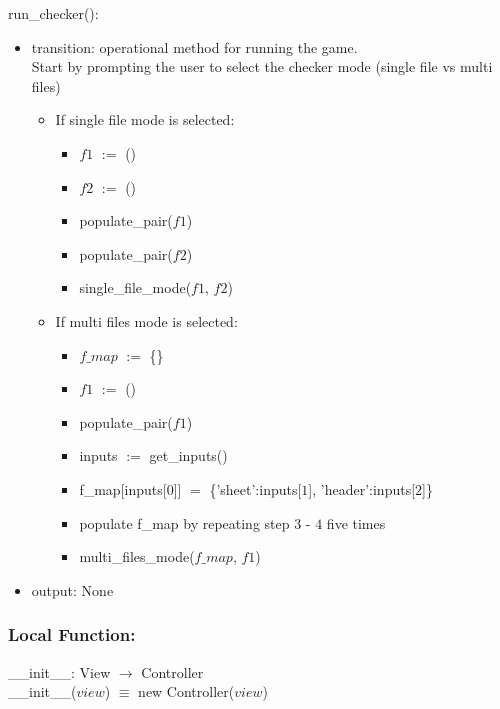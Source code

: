 \documentclass[12pt]{article}
\begin{document}
\noindent run\_checker():
\begin{itemize}
  \item transition: operational method for running the game. \\
  Start by prompting the user to select the checker mode (single file vs multi files)
  \begin{itemize}
    \item If single file mode is selected:
      \begin{itemize}[\null]
        \item $f1$ $:=$ () 
        \item $f2$ $:=$ ()
        \item populate\_pair($f1$)
        \item populate\_pair($f2$)
        \item single\_file\_mode($f1$, $f2$)
      \end{itemize}
    \item If multi files mode is selected:
      \begin{itemize}[\null]
        \item $f\_map$ $:=$ \{\}
        \item $f1$ $:=$ () 
        \item populate\_pair($f1$)
        \item inputs $:=$ get\_inputs()
        \item f\_map[inputs[$0$]] $=$ \{'sheet':inputs[$1$], 'header':inputs[$2$]\}
        \item populate f\_map by repeating step $3$ - $4$ five times
        \item multi\_files\_mode($f\_map$, $f1$)
      \end{itemize}
  \end{itemize}

  \item output: None
\end{itemize}

\subsubsection*{Local Function:}

\_\_init\_\_: View $\rightarrow$ Controller \\
\_\_init\_\_($view$) $\equiv$ new Controller($view$) \\

\end{document}
